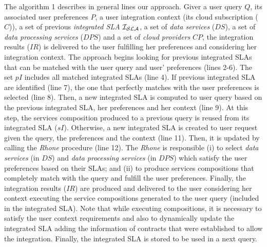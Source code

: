 The algorithm 1 describes in general lines our approach. Giver a user query $Q$, its associated user preferences $P$, a user integration context (its cloud subscription ($C$)), a set of previous \textit{integrated SLA} $\bigSLA$, a set of \textit{data services} ($DS$), a set of \textit{data processing services} ($DPS$) and a set of \textit{cloud providers} $CP$, the integration results ($IR$) is delivered to the user fulfilling her preferences and considering her integration context. The approach begins looking for previous integrated SLAs that can be matched with the user query and user' preferences (lines 2-6). The set $pI$ includes all matched integrated SLAs (line 4). If previous integrated SLA are identified (line 7), the one that perfectly matches with the user preferences is selected (line 8). Then, a new integrated SLA is computed to user query based on the previous integrated SLA, her preferences and her context (line 9). At this step, the services composition produced to a previous query is reused from its integrated SLA ($sI$). Otherwise, a new integrated SLA is created to user request given the query, the preferences and the context (line 11). Then, it is updated by calling the \textit{Rhone} procedure (line 12). The \textit{Rhone} is responsible (i) to select \textit{data services} (in $DS$) and \textit{data processing services} (in $DPS$) which satisfy the user preferences based on their SLAs; and (ii) to produce services compositions that completely match with the query and fulfill the user preferences. Finally, the integration results ($IR$) are produced and delivered to the user considering her context executing the service compositions generated to the user query (included in the integrated SLA). Note that while executing compositions, it is necessary to satisfy the user context requirements and also to dynamically update the integrated SLA adding the information of contracts that were established to allow the integration. Finally, the integrated SLA is stored to be used in a next query.   

